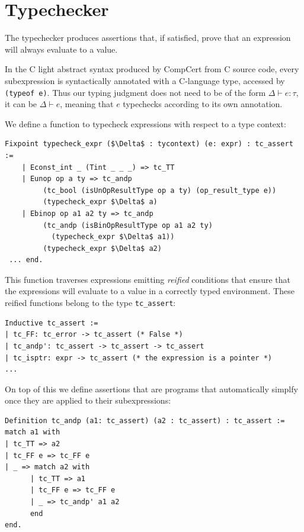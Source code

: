 \documentclass{puthesis}
\begin{document}
\section{Typechecker} 
\label{sec:typechecker}
The typechecker produces assertions that, if satisfied, prove that an
expression will always evaluate to a value.  

In the C light abstract syntax produced by CompCert from C source code,
every subexpression is syntactically annotated
with a C-language type, accessed by \lstinline{(typeof e)}. 
Thus our typing judgment does not need to be of the
form $\Delta \vdash e : \tau$, it can be
$\Delta \vdash e $, meaning that $e$ typechecks according to its
own annotation.

We define a function to typecheck expressions with respect to a type context:
\pagebreak
\begin{lstlisting}
Fixpoint typecheck_expr ($\Delta$ : tycontext) (e: expr) : tc_assert :=
    | Econst_int _ (Tint _ _ _) => tc_TT 
    | Eunop op a ty => tc_andp 
         (tc_bool (isUnOpResultType op a ty) (op_result_type e)) 
         (typecheck_expr $\Delta$ a) 
    | Ebinop op a1 a2 ty => tc_andp 
         (tc_andp (isBinOpResultType op a1 a2 ty)  
           (typecheck_expr $\Delta$ a1)) 
         (typecheck_expr $\Delta$ a2)
 ... end.
\end{lstlisting}

\noindent This function traverses expressions emitting \emph{reified}
conditions that ensure that the expressions will evaluate to a value
in a correctly typed environment. These reified functions belong to
the type \lstinline|tc_assert|:

\begin{lstlisting}
Inductive tc_assert :=
| tc_FF: tc_error -> tc_assert (* False *)
| tc_andp': tc_assert -> tc_assert -> tc_assert
| tc_isptr: expr -> tc_assert (* the expression is a pointer *)
...
\end{lstlisting}

On top of this we define assertions that are programs that
automatically simplfy once they are applied to their subexpressions:

\begin{lstlisting}
Definition tc_andp (a1: tc_assert) (a2 : tc_assert) : tc_assert :=
match a1 with
| tc_TT => a2
| tc_FF e => tc_FF e
| _ => match a2 with
      | tc_TT => a1 
      | tc_FF e => tc_FF e
      | _ => tc_andp' a1 a2
      end
end. 
\end{lstlisting}
\end{document}
